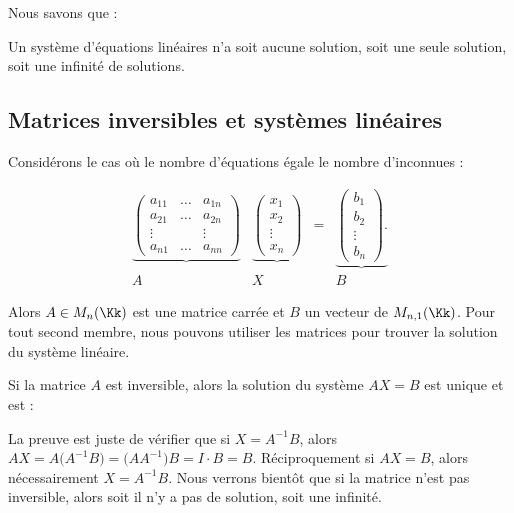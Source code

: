 \documentclass[class=report,crop=false]{standalone}
\begin{document}
Nous savons que :
\begin{theoreme}
Un système d'équations linéaires n'a soit aucune solution,
soit une seule solution, soit une infinité de solutions.
\end{theoreme}


\subsection{Matrices inversibles et systèmes linéaires}


Considérons le cas où le nombre d'équations égale le nombre d'inconnues :

\begin{equation*}\begin{array}{cccc}
\underbrace{
\left(
\begin{array}{ccc}
a_{11} & \dots & a_{1n}\\
a_{21} & \dots & a_{2n}\\
\vdots &&\vdots\\
a_{n1} &\dots & a_{nn}
\end{array}
\right)
}
&
\underbrace{
\left(
\begin{array}{c}
x_1\\
x_2\\
\vdots\\
x_n
\end{array}
\right)
}
& = &
\underbrace{
\left(
\begin{array}{c}
b_1\\
b_2\\
\vdots\\
b_n
\end{array}
\right).
}
\\
A & X & & B
\end{array}\end{equation*}


Alors $A \in M_n(\Kk)$ est une matrice carrée et
$B$ un vecteur de $M_{n,1}(\Kk)$.
Pour tout second membre, nous pouvons utiliser les matrices
pour trouver la solution du système linéaire.
\begin{proposition}
Si la matrice $A$ est inversible, alors
la solution du système $AX=B$ est unique et est :
\end{proposition}

La preuve est juste de vérifier que si $X = A^{-1}B$,
alors $AX = A\big(A^{-1}B\big) = \big(AA^{-1}\big)B = I \cdot B=B$.
Réciproquement si $AX=B$, alors nécessairement $X= A^{-1}B$.
Nous verrons bientôt que si la matrice n'est pas inversible,
alors soit il n'y a pas de solution, soit une infinité.
\end{document}
